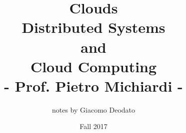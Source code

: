 \documentclass[12pt,a4paper,oneside,final,titlepage,openany,onecolumn]{book}
\begin{document}
\author{notes by Giacomo Deodato}
\title{Clouds\\ \textbf{Distributed Systems\\and\\Cloud Computing}\\ - Prof. Pietro Michiardi -}
\date{Fall 2017}

\frontmatter
\maketitle
\tableofcontents
\mainmatter







\backmatter
\end{document}
